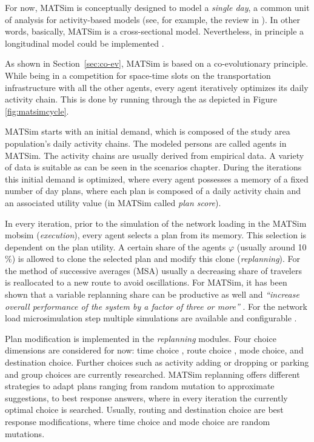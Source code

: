 For now, MATSim is conceptually designed to model a \emph{single day}, a common unit of analysis for activity-based models (see, for example, the review in \citet[][]{Bowman_TEC_2009_1}). In other words, basically, MATSim is a cross-sectional model. Nevertheless, in principle a longitudinal model could be implemented \citep[][]{HorniEtAl_TechRep_IVT_2012_a}.

As shown in Section~\ref{sec:co-ev}, MATSim is based on a co-evolutionary principle. While being in a competition for space-time slots on the transportation infrastructure with all the other agents, every agent iteratively optimizes its daily activity chain. This is done by running through the  as depicted in Figure \ref{fig:matsimcycle}. 

MATSim starts with an initial demand, which is composed of the study area population's daily activity chains. The modeled persons are called agents in MATSim. The activity chains are usually derived from empirical data. A variety of data is suitable as can be seen in the scenarios chapter. During the iterations this initial demand is optimized, where every agent possesses a memory of a fixed number of day plans, where each plan is composed of a daily activity chain and an associated utility value (in MATSim called \emph{plan score}).

In every iteration, prior to the simulation of the network loading in the MATSim \gls{mobsim} \citep[e.g.,][]{Cetin_PhDThesis_2005} (\emph{execution}), every agent selects a plan from its memory. This selection is dependent on the plan utility. A certain share of the agents $\varphi$ (usually around 10$\%$) is allowed to clone the selected plan and modify this clone (\emph{replanning}). For the method of successive averages (MSA) usually a decreasing share of travelers is reallocated to a new route to avoid oscillations. For MATSim, it has been shown that a variable replanning share can be productive as well and \emph{``increase overall performance of the system by a factor of three or more''} \citep[][p.7f]{CharyparEtAl_IATBR_2006}. For the network load microsimulation step multiple simulations are available and configurable \citep[][p.10f]{HorniEtAl_TechRep_IVT_2011_a}. 

Plan modification is implemented in the \emph{replanning} modules. Four choice dimensions are considered for now: time choice \citep[][]{BalmerEtAl_Timmermans_2005}, route choice \citep[]{LefebvreBalmer_STRC_2007}, mode choice, and destination choice. Further choices such as activity adding or dropping or parking and group choices are currently researched. %
MATSim replanning offers different strategies to adapt plans ranging from random mutation to approximate suggestions, to best response answers, where in every iteration the currently optimal choice is searched. Usually, routing and destination choice are best response modifications, where time choice and mode choice are random mutations. 

